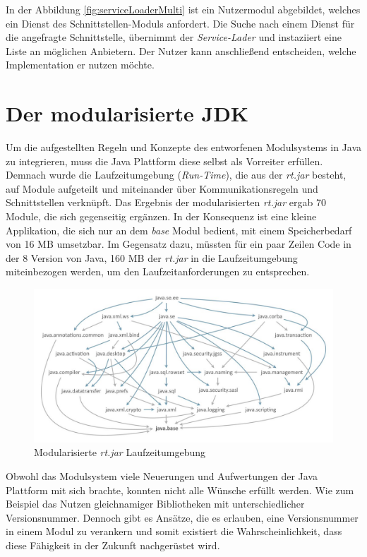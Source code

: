     In der Abbildung \ref{fig:serviceLoaderMulti} ist ein Nutzermodul abgebildet, welches ein Dienst des Schnittstellen-Moduls anfordert. Die Suche nach einem Dienst für die angefragte Schnittstelle, übernimmt der \textit{Service-Lader} und instaziiert eine Liste an möglichen Anbietern. Der Nutzer kann anschließend entscheiden, welche Implementation er nutzen möchte.   


\section{Der modularisierte JDK} \label{sec:modular_java_base}
  Um die aufgestellten Regeln und Konzepte des entworfenen Modulsystems in Java zu integrieren, muss die Java Plattform diese selbst als Vorreiter erfüllen. \bigbreak
  Demnach wurde die Laufzeitumgebung (\textit{Run-Time}), die aus der \textit{rt.jar} besteht, auf Module aufgeteilt und miteinander über Kommunikationsregeln und Schnittstellen verknüpft. Das Ergebnis der modularisierten \textit{rt.jar} ergab 70 Module, die sich gegenseitig ergänzen. \newline
  In der Konsequenz ist eine kleine Applikation, die sich nur an dem \textit{base} Modul bedient, mit einem Speicherbedarf von 16 MB umsetzbar. Im Gegensatz dazu, müssten für ein paar Zeilen Code in der 8 Version von Java, 160 MB der \textit{rt.jar} in die Laufzeitumgebung miteinbezogen werden, um den Laufzeitanforderungen zu entsprechen.\bigbreak
  \begin{figure}[h!]
   \centering
   \includegraphics[width=\textwidth]{material/images/moduleGraph.jpg}
   \caption{Modularisierte \textit{rt.jar} Laufzeitumgebung \cite{modGraph}}
   \label{fig:jdk}
  \end{figure}
  Obwohl das Modulsystem viele Neuerungen und Aufwertungen der Java Plattform mit sich brachte, konnten nicht alle Wünsche erfüllt werden. Wie zum Beispiel das Nutzen gleichnamiger Bibliotheken mit unterschiedlicher Versionsnummer.\newline
  Dennoch gibt es Ansätze, die es erlauben, eine Versionsnummer in einem Modul zu verankern und somit existiert die Wahrscheinlichkeit, dass diese Fähigkeit in der Zukunft nachgerüstet wird. 
 

